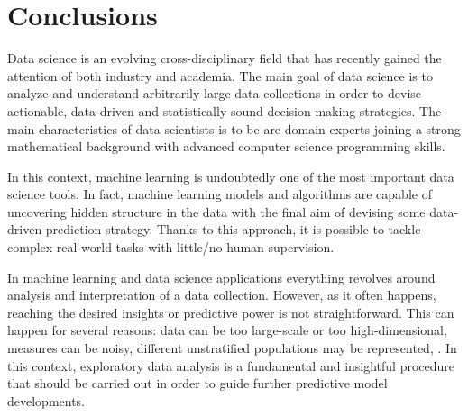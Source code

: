 
\chapter{Conclusions} \label{chap:conclusions}

Data science is an evolving cross-disciplinary field that has recently gained the attention of both industry and academia.
The main goal of data science is to analyze and understand arbitrarily large data collections in order to devise actionable, data-driven and statistically sound decision making strategies.
The main characteristics of data scientists is to be are domain experts joining a strong mathematical background with advanced computer science programming skills.

In this context, machine learning is undoubtedly one of the most important data science tools.
In fact, machine learning models and algorithms are capable of uncovering hidden structure in the data with the final aim of devising some data-driven prediction strategy.
Thanks to this approach, it is possible to tackle complex real-world tasks with little/no human supervision.

In machine learning and data science applications everything revolves around analysis and interpretation of a data collection.
However, as it often happens, reaching the desired insights or predictive power is not straightforward.
This can happen for several reasons: \eg data can be too large-scale or too high-dimensional, measures can be noisy, different unstratified populations may be represented, \etc.
In this context, exploratory data analysis is a fundamental and insightful procedure that should be carried out in order to guide further predictive model developments.

